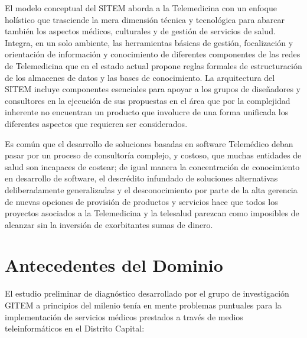 El modelo conceptual del SITEM aborda a la Telemedicina con un enfoque holístico que trasciende la mera dimensión técnica y tecnológica para abarcar también los aspectos médicos, culturales y de gestión de servicios de salud. Integra, en un solo ambiente, las herramientas básicas de gestión, focalización y orientación de información y conocimiento de diferentes componentes de las redes de Telemedicina que en el estado actual propone reglas formales de estructuración de los almacenes de datos y las bases de conocimiento. La arquitectura del SITEM incluye componentes esenciales para apoyar a los grupos de diseñadores y consultores en la ejecución de sus propuestas en el área que por la complejidad inherente no encuentran un producto que involucre de una forma unificada los diferentes aspectos que requieren ser considerados.

Es común que el desarrollo de soluciones basadas en software Telemédico deban pasar por un proceso de consultoría complejo, y costoso, que muchas entidades de salud son incapaces de costear; de igual manera la concentración de conocimiento en desarrollo de software, el descrédito infundado de soluciones alternativas deliberadamente generalizadas y el desconocimiento por parte de la alta gerencia de nuevas opciones de provisión de productos y servicios hace que todos los proyectos asociados a la Telemedicina y la telesalud parezcan como imposibles de alcanzar sin la inversión de exorbitantes sumas de dinero.
 
\section{Antecedentes del Dominio}
El estudio preliminar de diagnóstico desarrollado por el grupo de investigación GITEM a principios del milenio tenía en mente problemas puntuales para la implementación de servicios médicos prestados a través de medios teleinformáticos en el Distrito Capital\cite{aparicio2000}:


